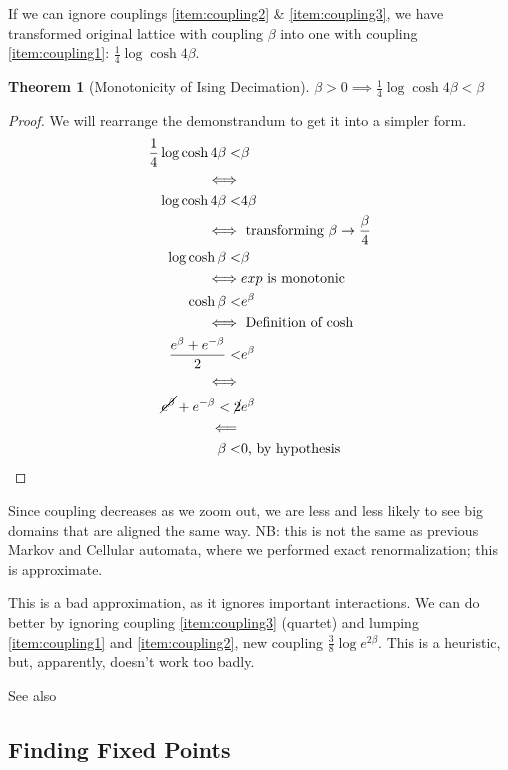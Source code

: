 \documentclass[]{article}
\newtheorem{thm}{Theorem}
\begin{document}
If we can ignore couplings \ref{item:coupling2} \& \ref{item:coupling3}, we have transformed original lattice with coupling $\beta$ into one with coupling \ref{item:coupling1}: $\frac{1}{4} \log{\cosh{4\beta}}$.

\begin{thm}[Monotonicity of Ising Decimation]
	$\beta > 0 \implies \frac{1}{4} \log{\cosh{4\beta}} < \beta$
\end{thm}

\begin{proof}
	We will rearrange the demonstrandum to get it into a simpler form.
	\begin{align*}
		 \frac{1}{4} \log{\cosh{4\beta}} <& \beta\\
		 \iff&\\
		 \log{\cosh{4\beta}} <& 4\beta\\
		 \iff&\text{ transforming $\beta\rightarrow\frac{\beta}{4}$}\\
		 \log{\cosh{\beta}} <& \beta\\
		 \iff&\text{$exp$ is monotonic}\\
		 \cosh{\beta} <& e^{\beta}\\
		 \iff& \text{ Definition of $\cosh$}\\
		 \frac{e^{\beta}+e^{-\beta}}{2}<&e^{\beta}\\
		 \iff&\\
		 \cancel{e^{\beta}}+e^{-\beta}<\cancel{2}&e^{\beta}\\
		 \impliedby&\\
		 \beta<&0 \text{, by hypothesis}
	\end{align*}

\end{proof}

Since coupling decreases as we zoom out, we are less and less likely to see big domains that are aligned the same way. NB: this is not the same as previous Markov and Cellular automata, where we performed exact renormalization; this is approximate.

This is a bad approximation, as it ignores important interactions. We can do better by ignoring coupling \ref{item:coupling3} (quartet) and lumping \ref{item:coupling1} and \ref{item:coupling2}, new coupling $\frac{3}{8} \log{e^{2\beta} }$. This is a heuristic, but, apparently, doesn't work too badly.


See also \cite[Chapter 14]{kadanoff2000statistical}


\subsection{Finding Fixed Points}
\end{document}
